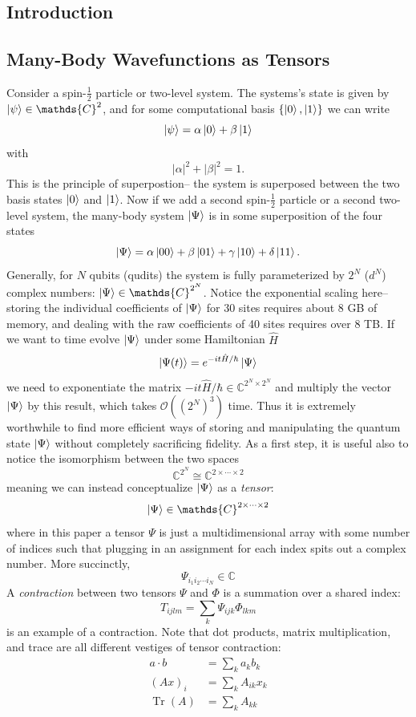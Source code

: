 \documentclass[12pt]{article}
\DeclareMathOperator{\Tr}{Tr}
\begin{document}
\begin{multicols}{2}

\section{Introduction}
	\subsection{Many-Body Wavefunctions as Tensors}
		Consider a spin-$\frac{1}{2}$ particle or two-level system. The systems's state is given by
		$\ket{\psi}\in\mathds{C}^2$, and for some computational basis
		$\{\ket{0}, \ket{1}\}$ we can write
		$$\ket{\psi}=\alpha\ket{0}+\beta\ket{1}$$
		with
		$$|\alpha|^2+|\beta|^2=1.$$
		This is the principle of superpostion-- the system is superposed
		between the two basis states $\ket{0}$ and $\ket{1}$. Now if we add
		a second spin-$\frac{1}{2}$ particle or a second two-level system, the many-body system
		$\ket{\Psi}$ is in some superposition of the four states
		$$\ket{\Psi}=\alpha\ket{00}+\beta\ket{01}+\gamma\ket{10}+\delta\ket{11}.$$
		Generally, for $N$ qubits (qudits) the system is fully
		parameterized by $2^N$ ($d^N$) complex numbers:
		$\ket{\Psi}\in\mathds{C}^{2^N}$. Notice the exponential scaling
		here--
		storing the individual coefficients of $\ket{\Psi}$ for 30 sites
		requires about 8 GB of memory, and dealing with the raw
		coefficients of 40 sites requires over 8 TB.
		If we want to time evolve $\ket{\Psi}$ under some Hamiltonian $\hat{H}$
		$$\ket{\Psi(t)}=e^{-it\hat{H}/\hbar}\ket{\Psi}$$
		we need to exponentiate the matrix $-it\hat{H}/\hbar\in\mathds{C}^{2^N\times2^N}$ and multiply the vector $\ket{\Psi}$ by this result, which takes $\mathcal{O}\left(\left(2^N\right)^3\right)$ time. Thus it is extremely worthwhile to find more efficient ways of storing and manipulating the
		quantum state $\ket{\Psi}$ without completely sacrificing fidelity.
		As a first step, it is useful also to notice the isomorphism between
		the two spaces
		$$\mathds{C}^{2^N}\cong\mathds{C}^{2\times\cdots\times 2}$$
		meaning we can instead conceptualize $\ket{\Psi}$ as a
		\textit{tensor}:
		$$\ket{\Psi}\in\mathds{C}^{2\times\cdots\times2}$$
		where in this paper a tensor $\Psi$ is just a multidimensional
		array with some number of indices such that plugging in an
		assignment for each index spits out a complex number. More
		succinctly,
		$$\Psi_{i_1i_2\cdots i_N}\in\mathds{C}$$
		A \textit{contraction} between two tensors $\Psi$ and $\Phi$ is
		a summation over a shared index:
		$$T_{ijlm}=\sum_k\Psi_{ijk}\Phi_{lkm}$$
		is an example of a contraction. Note that dot products, matrix
		multiplication, and trace are all different vestiges of tensor
		contraction:
				\begin{align*}
				a\cdot b &=\sum_ka_kb_k\\
				(Ax)_{i} &=\sum_kA_{ik}x_k\\
				\Tr(A)&=\sum_kA_{kk}
			\end{align*}



\end{multicols}
\end{document}
